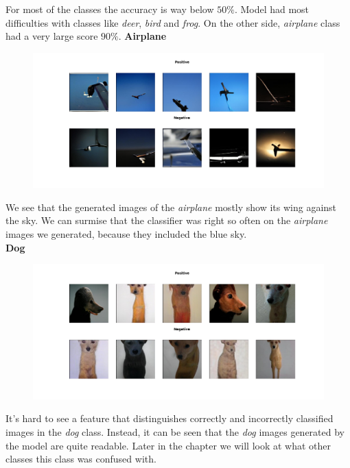 \documentclass[11pt,a4paper,openany]{book}
\begin{document}
\noindent For most of the classes the accuracy is way below $50\%$. Model had most difficulties with classes like \textit{deer}, \textit{bird} and \textit{frog}. On the other side, \textit{airplane} class had a very large score $90\%$.
\newline
\noindent \textbf{Airplane}
\begin{figure}[ht!]
    \centering
    \includegraphics[scale=0.40]{figs/cifar10_examples/airplane.png}
\end{figure} 
\newline
\noindent We see that the generated images of the \textit{airplane} mostly show its wing against the sky. We can surmise that the classifier was right so often on the \textit{airplane} images we generated, because they included the blue sky. \\
\newline
\noindent \textbf{Dog} \\
\begin{figure}[ht!]
    \centering
    \includegraphics[scale=0.40]{figs/cifar10_examples/dog.png}
\end{figure}
\newline It's hard to see a feature that distinguishes correctly and incorrectly classified images in the \textit{dog} class. Instead, it can be seen that the \textit{dog} images generated by the model are quite readable. Later in the chapter we will look at what other classes this class was confused with.
\end{document}
